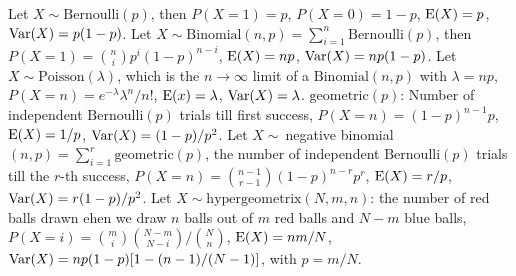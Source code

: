  Let $X\sim\mathrm{Bernoulli}(p)$, then $P(X = 1) = p$, $P(X=0) = 1-p$, $\operatorname{E}(X) = p$, $\operatorname{Var}(X) = p(1-p)$.
 Let $X\sim\mathrm{Binomial}(n, p) = \sum^{n}_{i=1} \mathrm{Bernoulli}(p)$, then $P(X = 1) = \binom{n}{i}p^i(1-p)^{n-i}$, $\operatorname{E}(X) = np$, $\operatorname{Var}(X) = np(1-p)$.
 Let $X \sim \mathrm{Poisson}(\lambda)$, which is the $n \to \infty$ limit of a $\mathrm{Binomial}(n,p)$ with $\lambda = np$, $P(X = n) = e^{-\lambda}\lambda^n/n!$, $\operatorname{E}(x) = \lambda$, $\operatorname{Var}(X) = \lambda$.
 $\mathrm{geometric}(p)$: Number of independent $\mathrm{Bernoulli}(p)$ trials till first success, $P(X = n) = (1-p)^{n-1}p$, $\operatorname{E}(X) = 1/p$, $\operatorname{Var}(X) = (1-p)/p^2$.
 Let $X \sim\ $negative binomial$(n,p) = \sum^{r}_{i = 1} \mathrm{geometric}(p)$, the number of independent $\mathrm{Bernoulli}(p)$ trials till the $r$-th success, $P(X = n) = \binom{n-1}{r-1}(1-p)^{n-r} p^r$, $\operatorname{E}(X) = r/p$, $\operatorname{Var}(X) = r(1-p)/p^2$.
 Let $X \sim \mathrm{hypergeometrix}(N,m,n)$: the number of red balls drawn ehen we draw $n$ balls out of $m$ red balls and $N-m$ blue balls, $P(X=i) = \binom{m}{i}\binom{N-m}{N-i}/\binom{N}{n}$, $\operatorname{E}(X) = nm/N$, $\operatorname{Var}(X) = np(1-p)[1-(n-1)/(N-1)]$, with $p = m/N$.